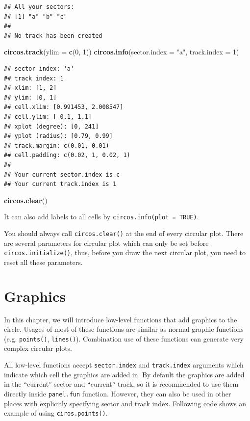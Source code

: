 \documentclass[]{book}
\newenvironment{Shaded}{\begin{snugshade}}{\end{snugshade}}
\newcommand{\KeywordTok}[1]{\textcolor[rgb]{0.13,0.29,0.53}{\textbf{#1}}}
\newcommand{\DataTypeTok}[1]{\textcolor[rgb]{0.13,0.29,0.53}{#1}}
\newcommand{\DecValTok}[1]{\textcolor[rgb]{0.00,0.00,0.81}{#1}}
\newcommand{\StringTok}[1]{\textcolor[rgb]{0.31,0.60,0.02}{#1}}
\newcommand{\NormalTok}[1]{#1}
\begin{document}
\begin{verbatim}
## All your sectors:
## [1] "a" "b" "c"
## 
## No track has been created
\end{verbatim}

\begin{Shaded}
\begin{Highlighting}[]
\KeywordTok{circos.track}\NormalTok{(}\DataTypeTok{ylim =} \KeywordTok{c}\NormalTok{(}\DecValTok{0}\NormalTok{, }\DecValTok{1}\NormalTok{))}
\KeywordTok{circos.info}\NormalTok{(}\DataTypeTok{sector.index =} \StringTok{"a"}\NormalTok{, }\DataTypeTok{track.index =} \DecValTok{1}\NormalTok{)}
\end{Highlighting}
\end{Shaded}

\begin{verbatim}
## sector index: 'a'
## track index: 1
## xlim: [1, 2]
## ylim: [0, 1]
## cell.xlim: [0.991453, 2.008547]
## cell.ylim: [-0.1, 1.1]
## xplot (degree): [0, 241]
## yplot (radius): [0.79, 0.99]
## track.margin: c(0.01, 0.01)
## cell.padding: c(0.02, 1, 0.02, 1)
## 
## Your current sector.index is c
## Your current track.index is 1
\end{verbatim}

\begin{Shaded}
\begin{Highlighting}[]
\KeywordTok{circos.clear}\NormalTok{()}
\end{Highlighting}
\end{Shaded}

It can also add labels to all cells by
\texttt{circos.info(plot\ =\ TRUE)}.

You should always call \texttt{circos.clear()} at the end of every
circular plot. There are several parameters for circular plot which can
only be set before \texttt{circos.initialize()}, thus, before you draw
the next circular plot, you need to reset all these parameters.

\chapter{Graphics}\label{graphics}

In this chapter, we will introduce low-level functions that add graphics
to the circle. Usages of most of these functions are similar as normal
graphic functions (e.g. \texttt{points()}, \texttt{lines()}).
Combination use of these functions can generate very complex circular
plots.

All low-level functions accept \texttt{sector.index} and
\texttt{track.index} arguments which indicate which cell the graphics
are added in. By default the graphics are added in the ``current''
sector and ``current'' track, so it is recommended to use them directly
inside \texttt{panel.fun} function. However, they can also be used in
other places with explicitly specifying sector and track index.
Following code shows an example of using \texttt{ciros.points()}.
\end{document}
